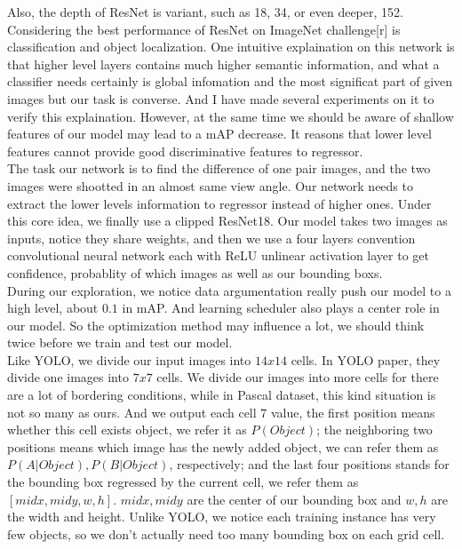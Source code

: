 \documentclass[12pt]{article}
\begin{document}
Also, the depth of ResNet is variant, such as 18, 34, or even deeper, 152. Considering the best performance of ResNet on ImageNet challenge[r] is classification and object localization. One intuitive explaination on this network is that higher level layers contains much higher semantic information, and what a classifier needs certainly is global infomation and the most significat part of given images but our task is converse. And I have made several experiments on it to verify this explaination. However, at the same time we should be aware of shallow features of our model may lead to a mAP decrease. It reasons that lower level features cannot provide good discriminative features to regressor.\\

The task our network is to find the difference of one pair images, and the two images were shootted in an almost same view angle. Our network needs to extract the lower levels information to regressor instead of higher ones. Under this core idea, we finally use a clipped ResNet18. Our model takes two images as inputs, notice they share weights, and then we use a four layers convention convolutional neural network each with ReLU unlinear activation layer to get confidence, probablity of which images as well as our bounding boxs.\\

During our exploration, we notice data argumentation really push our model to a high level, about $0.1$ in mAP. And learning scheduler also plays a center role in our model. So the optimization method may influence a lot, we should think twice before we train and test our model.\\

Like YOLO, we divide our input images into $14x14$ cells. In YOLO paper, they divide one images into $7x7$ cells. We divide our images into more cells for there are a lot of bordering conditions, while in Pascal dataset, this kind situation is not so many as ours. And we output each cell $7$ value, the first position means whether this cell exists object, we refer it as $P(Object)$; the neighboring two positions means which image has the newly added object, we can refer them as $P(A|Object), P(B|Object)$, respectively; and the last four positions stands for the bounding box regressed by the current cell, we refer them as $[midx, midy, w, h]$. $midx, midy$ are the center of our bounding box and $w, h$ are the width and height. Unlike YOLO, we notice each training instance has very few objects, so we don't actually need too many bounding box on each grid cell.\\
\end{document}
